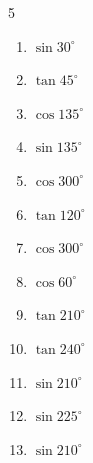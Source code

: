 \begin{multicols}{5}
\begin{enumerate}
  \item $\displaystyle \sin{30^\circ}$


  \item $\displaystyle \tan{45^\circ}$

        \phantom{$\displaystyle =1$}

  \item $\displaystyle \cos{135^\circ}$


  \item $\displaystyle \sin{135^\circ}$


\columnbreak %

  \item $\displaystyle \cos{300^\circ}$


  \item $\displaystyle \tan{120^\circ}$


  \item $\displaystyle \cos{300^\circ}$


  \item $\displaystyle \cos{60^\circ}$


  \item $\displaystyle \tan{210^\circ}$


  \item $\displaystyle \tan{240^\circ}$


  \item $\displaystyle \sin{210^\circ}$


  \item $\displaystyle \sin{225^\circ}$


  \item $\displaystyle \sin{210^\circ}$


\end{enumerate}
\end{multicols}
